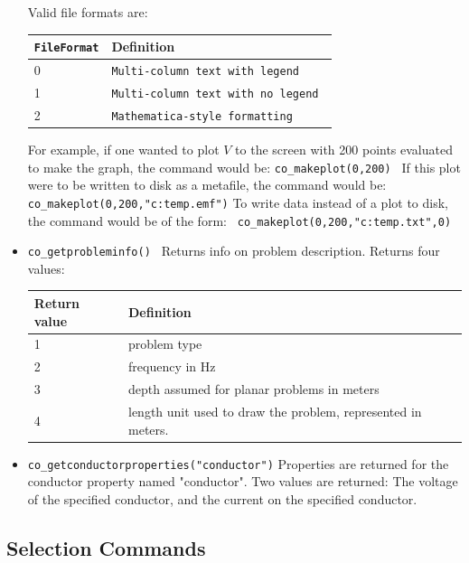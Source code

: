 \begin{itemize}
\vspace*{8pt}
Valid file formats are:

\begin{tabular}{ll}
\texttt{FileFormat} &  Definition  \\ \hline
 0 & \texttt{Multi-column text with legend } \\
 1 & \texttt{Multi-column text with no legend } \\
 2 & \texttt{Mathematica-style formatting}
\end{tabular}

For example, if one wanted to plot $V $ to the screen with 200 points evaluated
to make the graph, the command would be: \newline
\texttt{co\_makeplot(0,200) } \newline
If this plot were to be written to disk as a metafile, the command
would be:\texttt{ } \newline
\texttt{co\_makeplot(0,200,"c:temp.emf")} \newline
To write data instead of a plot to disk, the command would be of
the form:\texttt{ } \newline
\texttt{co\_makeplot(0,200,"c:temp.txt",0)} \newline


\item \texttt{co\_getprobleminfo() } 
Returns info on problem description. Returns four values:

\begin{tabular}{ll} \hline
Return value & Definition \\ \hline 
1 &  problem type  \\ 
2 &  frequency in Hz \\ 
3 &  depth assumed for planar problems in meters \\
4 &  length unit used to draw the problem, represented in meters.
\end{tabular}

\item \texttt{co\_getconductorproperties("conductor")} Properties are returned for the
conductor property named "conductor". Two values are returned: The voltage
of the specified conductor, and the current on the specified
conductor.
\end{itemize}

\subsection{Selection Commands}

